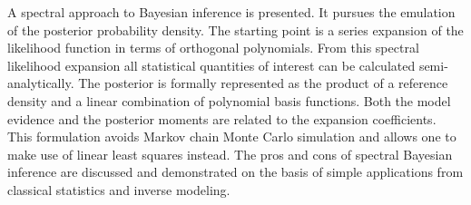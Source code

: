 A spectral approach to Bayesian inference is presented.
It pursues the emulation of the posterior probability density.
The starting point is a series expansion of the likelihood function in terms of orthogonal polynomials.
From this spectral likelihood expansion all statistical quantities of interest can be calculated semi-analytically.
The posterior is formally represented as the product of a reference density and a linear combination of polynomial basis functions.
Both the model evidence and the posterior moments are related to the expansion coefficients.
This formulation avoids Markov chain Monte Carlo simulation and allows one to make use of linear least squares instead.
The pros and cons of spectral Bayesian inference are discussed and demonstrated on the basis of simple applications from classical statistics and inverse modeling.